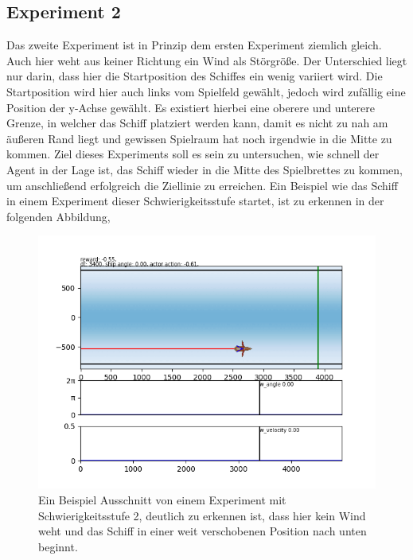 \documentclass[]{iat}
\begin{document}
\subsection*{Experiment 2}
Das zweite Experiment ist in Prinzip dem ersten Experiment ziemlich gleich. Auch hier weht aus keiner Richtung ein Wind als Störgröße. Der Unterschied liegt nur darin, dass hier die Startposition des Schiffes ein wenig variiert wird. Die Startposition wird hier auch links vom Spielfeld gewählt, jedoch wird zufällig eine Position der y-Achse gewählt. Es existiert hierbei eine oberere und unterere Grenze, in welcher das Schiff platziert werden kann, damit es nicht zu nah am äußeren Rand liegt und gewissen Spielraum hat noch irgendwie in die Mitte zu kommen. Ziel dieses Experiments soll es sein zu untersuchen, wie schnell der Agent in der Lage ist, das Schiff wieder in die Mitte des Spielbrettes zu kommen, um anschließend erfolgreich die Ziellinie zu erreichen. Ein Beispiel wie das Schiff in einem Experiment dieser Schwierigkeitsstufe startet, ist zu erkennen in der folgenden Abbildung,
\begin{figure}[H]
    \includegraphics[width=\textwidth]{graphics/settings/s2.png}
    \centering
    \caption{Ein Beispiel Ausschnitt von einem Experiment mit Schwierigkeitsstufe 2, deutlich zu erkennen ist, dass hier kein Wind weht und das Schiff in einer weit verschobenen Position nach unten beginnt.}
    \label{abb:setting2}
\end{figure}
\end{document}
